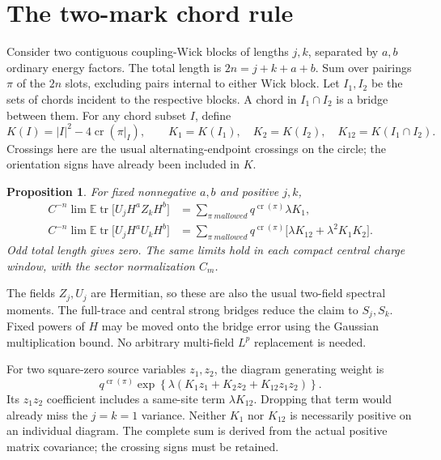 \documentclass[11pt]{article}
\newcommand{\EE}{\mathbb E}
\newcommand{\tr}{\operatorname{tr}}
\newcommand{\crs}{\operatorname{cr}}
\newtheorem{proposition}{Proposition}
\begin{document}
\newpage
\section{The two-mark chord rule}
Consider two contiguous coupling-Wick blocks of lengths $j,k$, separated
by $a,b$ ordinary energy factors. The total length is $2n=j+k+a+b$.
Sum over pairings $\pi$ of the $2n$ slots, excluding pairs internal to
either Wick block. Let $I_1,I_2$ be the sets of chords incident to
the respective blocks. A chord in $I_1\cap I_2$ is a bridge between them.
For any chord subset $I$, define
\begin{equation}
 K(I)=|I|^2-4\crs(\pi|_I),\qquad
 K_1=K(I_1),\quad K_2=K(I_2),\quad K_{12}=K(I_1\cap I_2).
\end{equation}
Crossings here are the usual alternating-endpoint crossings on the
circle; the orientation signs have already been included in $K$.

\begin{proposition}
For fixed nonnegative $a,b$ and positive $j,k$,
\begin{align}
 C^{-n}\lim\EE\tr\bigl[U_jH^aZ_kH^b\bigr]
 &=\sum_{\pi\ {
m allowed}}q^{\crs(\pi)}\lambda K_1,\label{eq:one}\\
 C^{-n}\lim\EE\tr\bigl[U_jH^aU_kH^b\bigr]
 &=\sum_{\pi\ {
m allowed}}q^{\crs(\pi)}
       \bigl[\lambda K_{12}+\lambda^2K_1K_2\bigr].\label{eq:two}
\end{align}
Odd total length gives zero. The same limits hold in each compact
central charge window, with the sector normalization $C_m$.
\end{proposition}
The fields $Z_j,U_j$ are Hermitian, so these are also the usual
two-field spectral moments. The full-trace and central strong bridges
reduce the claim to $S_j,S_k$. Fixed powers of $H$ may be moved onto
the bridge error using the Gaussian multiplication bound. No arbitrary
multi-field $L^p$ replacement is needed.

For two square-zero source variables $z_1,z_2$, the diagram generating
weight is
\begin{equation}
 q^{\crs(\pi)}
 \exp\!\left\{\lambda(K_1z_1+K_2z_2+K_{12}z_1z_2)\right\}.
\end{equation}
Its $z_1z_2$ coefficient includes a same-site term $\lambda K_{12}$.
Dropping that term would already miss the $j=k=1$ variance.
Neither $K_1$ nor $K_{12}$ is necessarily positive on an individual
diagram. The complete sum is derived from the actual positive
matrix covariance; the crossing signs must be retained.
\end{document}
